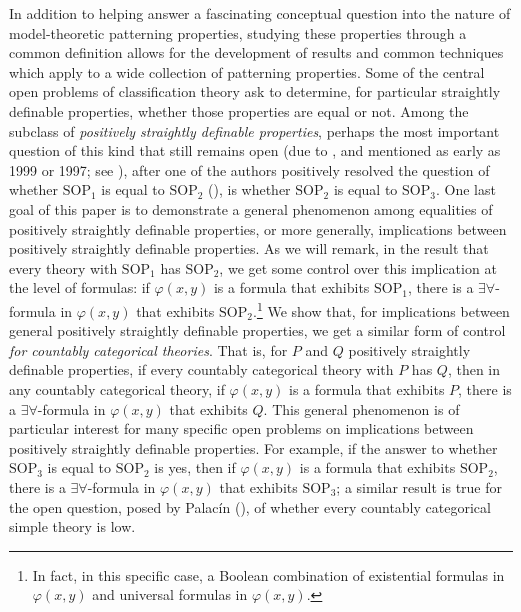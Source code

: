 \documentclass{article}
\theoremstyle{definition}
\theoremstyle{definition}
\theoremstyle{definition}
\begin{document}
In addition to helping answer a fascinating conceptual question into the nature of model-theoretic patterning properties, studying these properties through a common definition allows for the development of results and common techniques which apply to a wide collection of patterning properties. Some of the central open problems of classification theory ask to determine, for particular straightly definable properties, whether those properties are equal or not. Among the subclass of \textit{positively straightly definable properties}, perhaps the most important question of this kind that still remains open (due to \cite{Dzamonja2004}, and mentioned as early as 1999 or 1997; see \cite{shelah_what_2000}), after one of the authors positively resolved the question of whether $\mathrm{SOP}_{1}$ is equal to $\mathrm{SOP}_{2}$ (\cite{Mutchnik2026nsop2}), is whether $\mathrm{SOP}_{2}$ is equal to $\mathrm{SOP}_{3}$. One last goal of this paper is to demonstrate a general phenomenon among equalities of positively straightly definable properties, or more generally, implications between positively straightly definable properties. As we will remark, in the result that every theory with $\mathrm{SOP}_{1}$ has $\mathrm{SOP}_{2}$, we get some control over this implication at the level of formulas: if $\varphi(x, y)$ is a formula that exhibits $\mathrm{SOP}_{1}$, there is a $\exists \forall$-formula in $\varphi(x, y)$ that exhibits $\mathrm{SOP}_{2}$.\footnote{In fact, in this specific case, a Boolean combination of existential formulas in $\varphi(x, y)$ and universal formulas in $\varphi(x, y)$.} We show that, for implications between general positively straightly definable properties, we get a similar form of control \textit{for countably categorical theories}. That is, for $P$ and $Q$ positively straightly definable properties, if every countably categorical theory with $P$ has $Q$, then in any countably categorical theory, if $\varphi(x, y)$ is a formula that exhibits $P$, there is a $\exists \forall$-formula in $\varphi(x, y)$ that exhibits $Q$. This general phenomenon is of particular interest for many specific open problems on implications between positively straightly definable properties. For example, if the answer to whether $\mathrm{SOP}_{3}$ is equal to $\mathrm{SOP}_{2}$ is yes, then  if $\varphi(x, y)$ is a formula that exhibits $\mathrm{SOP}_{2}$, there is a $\exists \forall$-formula in $\varphi(x, y)$ that exhibits $\mathrm{SOP}_{3}$; a similar result is true for the open question, posed by Palacín (\cite{palacin2012omega}), of whether every countably categorical simple theory is low.
\end{document}
